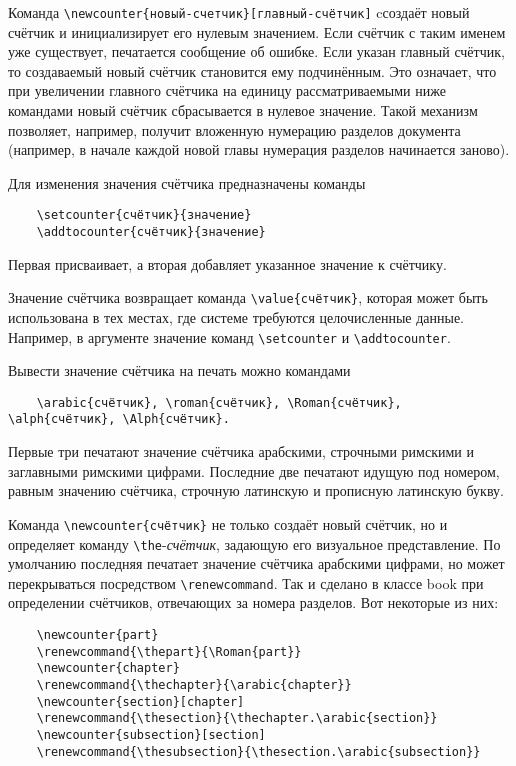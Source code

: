 \documentclass[a4paper,11pt]{article} %
\begin{document}
Команда \verb"\newcounter{новый-счетчик}[главный-счётчик]" cсоздаёт новый счётчик и инициализирует его нулевым значением. Если счётчик с таким именем уже существует, печатается сообщение об ошибке. Если указан главный счётчик, то создаваемый новый счётчик становится ему подчинённым. Это означает, что при увеличении главного счётчика на единицу рассматриваемыми ниже командами новый счётчик сбрасывается в нулевое значение. Такой механизм позволяет, например, получит вложенную нумерацию разделов документа (например, в начале каждой новой главы нумерация разделов начинается заново).

Для изменения значения счётчика предназначены команды
\begin{verbatim}
	\setcounter{счётчик}{значение}
	\addtocounter{счётчик}{значение}
\end{verbatim}
Первая присваивает, а вторая добавляет указанное значение к счётчику.

Значение счётчика возвращает команда \verb"\value{счётчик}", которая может быть использована в тех местах, где системе требуются целочисленные данные. Например, в аргументе значение команд \verb"\setcounter" и \verb"\addtocounter".

Вывести значение счётчика на печать можно командами
\begin{verbatim}
	\arabic{счётчик}, \roman{счётчик}, \Roman{счётчик}, \alph{счётчик}, \Alph{счётчик}.
\end{verbatim}
Первые три печатают значение счётчика арабскими, строчными римскими и заглавными римскими цифрами. Последние две печатают идущую под номером, равным значению счётчика, строчную латинскую и прописную латинскую букву.

Команда \verb"\newcounter{счётчик}" не только создаёт новый счётчик, но и определяет команду \verb"\the"-\textit{счётчик}, задающую его визуальное представление. По умолчанию последняя печатает значение счётчика арабскими цифрами, но может перекрываться посредством \verb"\renewcommand". Так и сделано в классе book при определении счётчиков, отвечающих за номера разделов. Вот некоторые из них:
{\sloppy
	
}
\begin{verbatim}
	\newcounter{part}
	\renewcommand{\thepart}{\Roman{part}}
	\newcounter{chapter}
	\renewcommand{\thechapter}{\arabic{chapter}}
	\newcounter{section}[chapter]
	\renewcommand{\thesection}{\thechapter.\arabic{section}}
	\newcounter{subsection}[section]
	\renewcommand{\thesubsection}{\thesection.\arabic{subsection}}
\end{verbatim}
\end{document}
